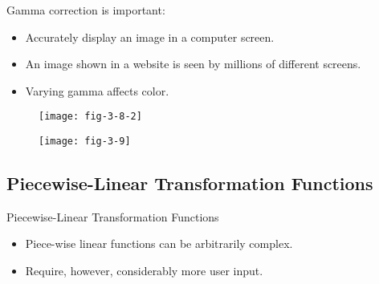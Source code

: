 
\begin{frame}
Gamma correction is important:
\begin{itemize}
\item Accurately display an image in a computer screen.
\item An image shown in a website is seen by millions of different screens.
\item Varying gamma affects color.
\end{itemize}
\end{frame}


\begin{frame}
\begin{figure}
\centering
\texttt{[image: fig-3-8-2]}
\end{figure}
\end{frame}


\begin{frame}
\begin{figure}
\centering
\texttt{[image: fig-3-9]}
\end{figure}
\end{frame}


\subsection{Piecewise-Linear Transformation Functions}


\begin{frame}{Piecewise-Linear Transformation Functions}
\begin{itemize}
\item Piece-wise linear functions can be arbitrarily complex.
\item Require, however, considerably more user input.
\end{itemize}
\end{frame}

